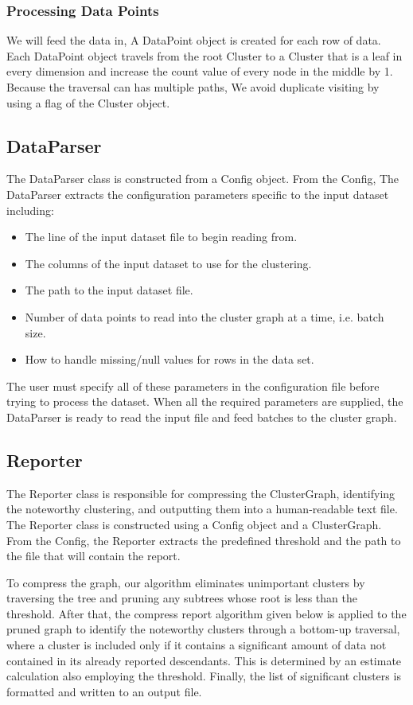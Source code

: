 \documentclass{article}
\begin{document}
\subsubsection{Processing Data Points}

We will feed the data in, A DataPoint object is created for each row of data. Each DataPoint object travels from the root Cluster to a Cluster that is a leaf in every dimension and increase the count value of every node in the middle by 1. Because the traversal can has multiple paths, We avoid duplicate visiting by using a flag of the Cluster object.

\subsection{DataParser}
The DataParser class is constructed from a Config object.  From the Config, The DataParser extracts the configuration parameters specific to the input dataset including:
\begin{itemize}
    \item The line of the input dataset file to begin reading from.
    \item The columns of the input dataset to use for the clustering.
    \item The path to the input dataset file.
    \item Number of data points to read into the cluster graph at a time, i.e. batch size.
    \item How to handle missing/null values for rows in the data set.
\end{itemize}
The user must specify all of these parameters in the configuration file before trying to process the dataset.  When all the required parameters are supplied, the DataParser is ready to read the input file and feed batches to the cluster graph.

\subsection{Reporter}
The Reporter class is responsible for compressing the ClusterGraph, identifying the noteworthy clustering, and outputting them into a human-readable text file. The Reporter class is constructed using a Config object and a ClusterGraph. From the Config, the Reporter extracts the predefined threshold and the path to the file that will contain the report.

To compress the graph, our algorithm eliminates unimportant clusters by traversing the tree and pruning any subtrees whose root is less than the threshold. After that, the compress report algorithm given below is applied to the pruned graph to identify the noteworthy clusters through a bottom-up traversal, where a cluster is included only if it contains a significant amount of data not contained in its already reported descendants. This is determined by an estimate calculation also employing the threshold. Finally, the list of significant clusters is formatted and written to an output file.
\end{document}

